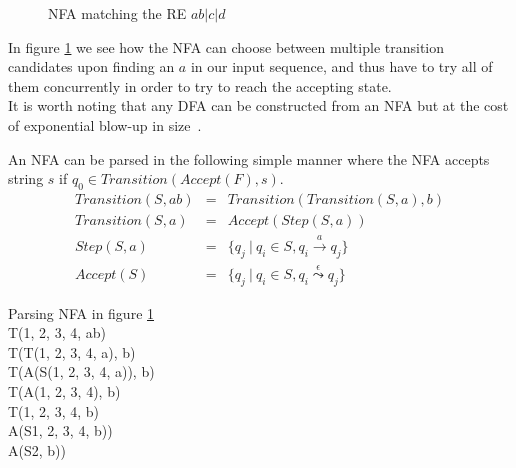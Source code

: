 \documentclass[12pt]{article}
\theoremstyle{definition}
\begin{document}
\begin{figure}[H]
  \begin{center}

	
	\caption{NFA matching the RE \underline{$ab|c|d$}}
	\label{nfa_simple}
  \end{center}
\end{figure}

In figure \ref{nfa_simple} we see how the NFA can choose between multiple transition candidates upon finding an $a$ in our input sequence, and thus have to try all of them concurrently in order to try to reach the accepting state. \\
It is worth noting that any DFA can be constructed from an NFA but at the cost of exponential blow-up in size~\cite{nfa-to-dfa}.

An NFA can be parsed in the following simple manner where the NFA accepts string $s$ if $q_0 \in Transition(Accept(F), s)$.
\begin{eqnarray}
	Transition(S, ab) & = & Transition(Transition(S, a), b) \\
	Transition(S, a) & = & Accept(Step(S, a)) \\
	Step(S, a) & = & \{ q_j\ |\ q_i \in S, q_i \xrightarrow{a} q_j \} \\
	Accept(S) & = & \{ q_j\ |\ q_i \in S, q_i \overset{\epsilon}{\leadsto} q_j \}
\end{eqnarray}

\begin{example}
Parsing NFA in figure \ref{nfa_simple} \\

T({1, 2, 3, 4}, ab) \\
T(T({1, 2, 3, 4}, a), b) \\
T(A(S({1, 2, 3, 4}, a)), b) \\
T(A({1, 2, 3, 4}), b) \\
T({1, 2, 3, 4}, b) \\
A(S{1, 2, 3, 4}, b)) \\
A(S{2}, b)) \\
\end{example}
\end{document}
